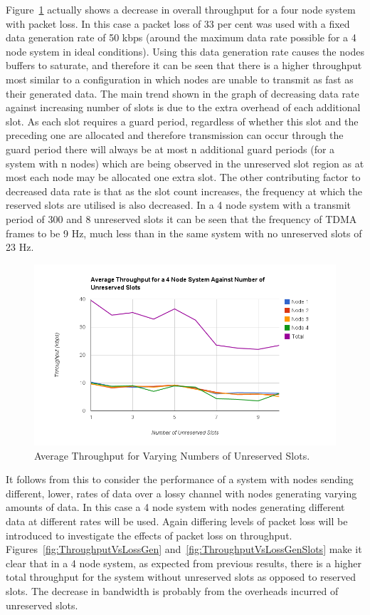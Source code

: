 \documentclass[parskip]{cs4rep}
\begin{document}
Figure~\ref{fig:ThroughputVsSlotCount4} actually shows a decrease in overall throughput for a four node system with packet loss. In this case a packet loss of 33 per cent was used with a fixed data generation rate of 50 kbps (around the maximum data rate possible for a 4 node system in ideal conditions). Using this data generation rate causes the nodes buffers to saturate, and therefore it can be seen that there is a higher throughput most similar to a configuration in which nodes are unable to transmit as fast as their generated data. The main trend shown in the graph of decreasing data rate against increasing number of slots is due to the extra overhead of each additional slot. As each slot requires a guard period, regardless of whether this slot and the preceding one are allocated and therefore transmission can occur through the guard period there will always be at most n additional guard periods (for a system with n nodes) which are being observed in the unreserved slot region as at most each node may be allocated one extra slot. The other contributing factor to decreased data rate is that as the slot count increases, the frequency at which the reserved slots are utilised is also decreased. In a 4 node system with a transmit period of 300 and 8 unreserved slots it can be seen that the frequency of TDMA frames to be 9 Hz, much less than in the same system with no unreserved slots of 23 Hz.

\begin{figure}
	\centering
	\includegraphics[width=120mm]{throughputvsslotcount4.png}
	\caption{Average Throughput for Varying Numbers of Unreserved Slots.}
	\label{fig:ThroughputVsSlotCount4}
\end{figure}

It follows from this to consider the performance of a system with nodes sending different, lower, rates of data over a lossy channel with nodes generating varying amounts of data. In this case a 4 node system with nodes generating different data at different rates will be used. Again differing levels of packet loss will be introduced to investigate the effects of packet loss on throughput. Figures~\ref{fig:ThroughputVsLossGen} and~\ref{fig:ThroughputVsLossGenSlots} make it clear that in a 4 node system, as expected from previous results, there is a higher total throughput for the system without unreserved slots as opposed to reserved slots. The decrease in bandwidth is probably from the overheads incurred of unreserved slots. 
\end{document}
